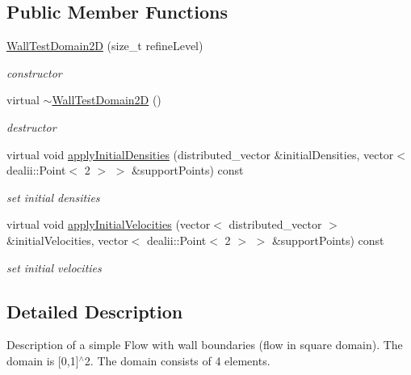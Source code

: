 \subsection*{Public Member Functions}
\begin{DoxyCompactItemize}
\item 
\hyperlink{classWallTestDomain2D_ae2a5588bd00b23f67587f5030520daca}{Wall\-Test\-Domain2\-D} (size\-\_\-t refine\-Level)
\begin{DoxyCompactList}\small\item\em constructor \end{DoxyCompactList}\item 
\hypertarget{classWallTestDomain2D_af086a6015fed51c4e1bd14e39fa52971}{virtual \hyperlink{classWallTestDomain2D_af086a6015fed51c4e1bd14e39fa52971}{$\sim$\-Wall\-Test\-Domain2\-D} ()}\label{classWallTestDomain2D_af086a6015fed51c4e1bd14e39fa52971}

\begin{DoxyCompactList}\small\item\em destructor \end{DoxyCompactList}\item 
virtual void \hyperlink{classWallTestDomain2D_a11b249db20612e04d2f0857c96e234b0}{apply\-Initial\-Densities} (distributed\-\_\-vector \&initial\-Densities, vector$<$ dealii\-::\-Point$<$ 2 $>$ $>$ \&support\-Points) const 
\begin{DoxyCompactList}\small\item\em set initial densities \end{DoxyCompactList}\item 
virtual void \hyperlink{classWallTestDomain2D_ad2921c1be674bd66d8d297c979bb84f2}{apply\-Initial\-Velocities} (vector$<$ distributed\-\_\-vector $>$ \&initial\-Velocities, vector$<$ dealii\-::\-Point$<$ 2 $>$ $>$ \&support\-Points) const 
\begin{DoxyCompactList}\small\item\em set initial velocities \end{DoxyCompactList}\end{DoxyCompactItemize}


\subsection{Detailed Description}
Description of a simple Flow with wall boundaries (flow in square domain). The domain is \mbox{[}0,1\mbox{]}$^\wedge$2. The domain consists of 4 elements. 

